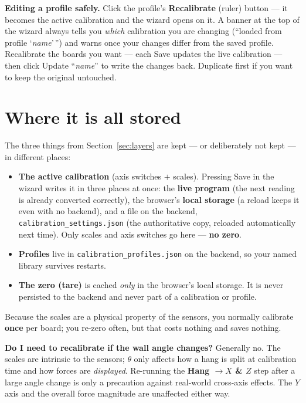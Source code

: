 \documentclass[11pt,a4paper]{article}
\begin{document}
\begin{infobox}
\textbf{Editing a profile safely.} Click the profile's \textbf{Recalibrate} (ruler)
button --- it becomes the active calibration and the wizard opens on it. A banner at
the top of the wizard always tells you \emph{which} calibration you are changing
(``loaded from profile `\emph{name}'\,'') and warns once your changes differ from the
saved profile. Recalibrate the boards you want --- each \textsf{Save} updates the
live calibration --- then click \textsf{Update ``\emph{name}''} to write the changes
back. \textsf{Duplicate} first if you want to keep the original untouched.
\end{infobox}

\section{Where it is all stored}
\label{sec:storage}

The three things from Section~\ref{sec:layers} are kept --- or deliberately not
kept --- in different places:
\begin{itemize}[leftmargin=1.4em]
  \item \textbf{The active calibration} (axis switches $+$ scales). Pressing
        \textsf{Save} in the wizard writes it in three places at once: the
        \textbf{live program} (the next reading is already converted correctly), the
        browser's \textbf{local storage} (a reload keeps it even with no backend),
        and a file on the backend, \texttt{calibration\_settings.json} (the
        authoritative copy, reloaded automatically next time). Only scales and axis
        switches go here --- \textbf{no zero}.
  \item \textbf{Profiles} live in \texttt{calibration\_profiles.json} on the
        backend, so your named library survives restarts.
  \item \textbf{The zero (tare)} is cached \emph{only} in the browser's local
        storage. It is never persisted to the backend and never part of a
        calibration or profile.
\end{itemize}
Because the scales are a physical property of the sensors, you normally calibrate
\textbf{once} per board; you re-zero often, but that costs nothing and saves
nothing.

\begin{infobox}
\textbf{Do I need to recalibrate if the wall angle changes?} Generally no. The
scales are intrinsic to the sensors; $\theta$ only affects how a hang is split at
calibration time and how forces are \emph{displayed}. Re-running the
\textbf{Hang $\rightarrow X$ \& $Z$} step after a large angle change is only a
precaution against real-world cross-axis effects. The $Y$ axis and the overall
force magnitude are unaffected either way.
\end{infobox}
\end{document}
